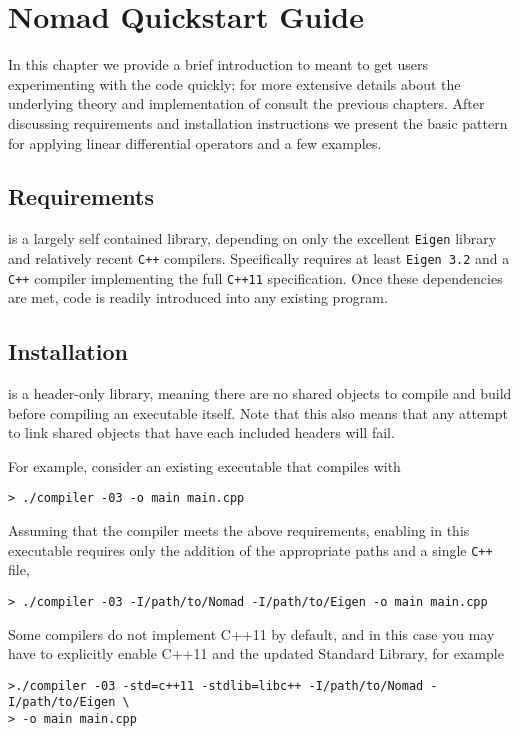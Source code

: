 \chapter{Nomad Quickstart Guide}

In this chapter we provide a brief introduction to \nomad meant
to get users experimenting with the code quickly; for more extensive
details about the underlying theory and implementation of \nomad
consult the previous chapters.  After discussing requirements and
installation instructions we present the basic \nomad pattern for
applying linear differential operators and a few examples.

\section{Requirements}

\nomad is a largely self contained library, depending on only the 
excellent \verb|Eigen| library and relatively recent \verb|C++| compilers.
Specifically \nomad requires at least \verb|Eigen 3.2| and a
\verb|C++| compiler implementing the full \verb|C++11| specification.
Once these dependencies are met, \nomad code is readily introduced 
into any existing program. 

\section{Installation}

\nomad is a header-only library, meaning there are no shared objects
to compile and build before compiling an executable itself.  Note that
this also means that any attempt to link shared objects that have each
included \nomad headers will fail.

For example, consider an existing executable that compiles with
%
\begin{verbatim}
> ./compiler -03 -o main main.cpp
\end{verbatim}
%
Assuming that the compiler meets the above requirements, enabling \nomad 
in this executable requires only the addition of the appropriate paths and
a single \verb|C++| file,
%
\begin{verbatim}
> ./compiler -03 -I/path/to/Nomad -I/path/to/Eigen -o main main.cpp
\end{verbatim}
%
Some compilers do not implement C++11 by default, and in
this case you may have to explicitly enable C++11 and the 
updated Standard Library, for example
%
\begin{verbatim}
>./compiler -03 -std=c++11 -stdlib=libc++ -I/path/to/Nomad -I/path/to/Eigen \
> -o main main.cpp
\end{verbatim}

